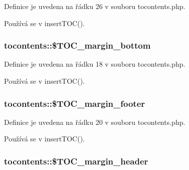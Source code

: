 Definice je uvedena na řádku 26 v souboru tocontents.\-php.



Používá se v insert\-T\-O\-C().

\hypertarget{classtocontents_a58abc5718a6515b4a19f3a6ca724efaf}{
\subsubsection[{\$\-T\-O\-C\-\_\-margin\-\_\-bottom}]{\setlength{\rightskip}{0pt plus 5cm}tocontents\-::\$\-T\-O\-C\-\_\-margin\-\_\-bottom}}\label{classtocontents_a58abc5718a6515b4a19f3a6ca724efaf}


Definice je uvedena na řádku 18 v souboru tocontents.\-php.



Používá se v insert\-T\-O\-C().

\hypertarget{classtocontents_a5f6ed9da7d556cd1a7ceca6da2229110}{
\subsubsection[{\$\-T\-O\-C\-\_\-margin\-\_\-footer}]{\setlength{\rightskip}{0pt plus 5cm}tocontents\-::\$\-T\-O\-C\-\_\-margin\-\_\-footer}}\label{classtocontents_a5f6ed9da7d556cd1a7ceca6da2229110}


Definice je uvedena na řádku 20 v souboru tocontents.\-php.



Používá se v insert\-T\-O\-C().

\hypertarget{classtocontents_ae6c21d48a5d4bd8c69ea5c62ce43704e}{
\subsubsection[{\$\-T\-O\-C\-\_\-margin\-\_\-header}]{\setlength{\rightskip}{0pt plus 5cm}tocontents\-::\$\-T\-O\-C\-\_\-margin\-\_\-header}}\label{classtocontents_ae6c21d48a5d4bd8c69ea5c62ce43704e}


